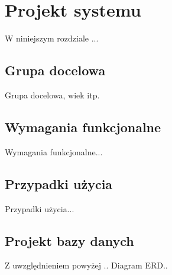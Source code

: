 \chapter{Projekt systemu}

W niniejszym rozdziale ...

\section{Grupa docelowa}

Grupa docelowa, wiek itp.

\section{Wymagania funkcjonalne}

Wymagania funkcjonalne...

\section{Przypadki użycia}

Przypadki użycia...

\section{Projekt bazy danych}

Z uwzględnieniem powyżej .. Diagram ERD..